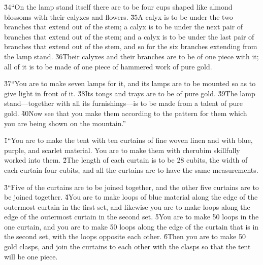 \v{34}``On the lamp stand itself there are to be four cups shaped like almond blossoms with their calyxes and flowers. \v{35}A calyx is to be under the two branches that extend out of the stem; a calyx is to be under the next pair of branches that extend out of the stem; and a calyx is to be under the last pair of branches that extend out of the stem, and so for the six branches extending from the lamp stand. \v{36}Their calyxes and their branches are to be of one piece with it; all of it is to be made of one piece of hammered work of pure gold.

\v{37}``You are to make seven lamps for it, and its lamps are to be mounted so as to give light in front of it. \v{38}Its tongs and trays are to be of pure gold. \v{39}The lamp stand---together with all its furnishings---is to be made from a talent of pure gold. \v{40}Now see that you make them according to the pattern for them which you are being shown on the mountain.''

\v{1}``You are to make the tent with ten curtains of fine woven linen and with blue, purple, and scarlet material. You are to make them with cherubim skillfully worked into them. \v{2}The length of each curtain is to be 28 cubits, the width of each curtain four cubits, and all the curtains are to have the same measurements.

\v{3}``Five of the curtains are to be joined together, and the other five curtains are to be joined together. \v{4}You are to make loops of blue material along the edge of the outermost curtain in the first set, and likewise you are to make loops along the edge of the outermost curtain in the second set. \v{5}You are to make 50 loops in the one curtain, and you are to make 50 loops along the edge of the curtain that is in the second set, with the loops opposite each other. \v{6}Then you are to make 50 gold clasps, and join the curtains to each other with the clasps so that the tent will be one piece.

